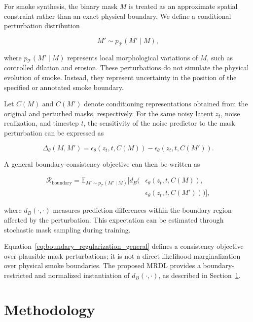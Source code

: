 \documentclass[journal]{IEEEtran}
\begin{document}
For smoke synthesis, the binary mask \(M\) is treated as an approximate
spatial constraint rather than an exact physical boundary. We define a
conditional perturbation distribution

\begin{equation}
M'\sim p_{\mathcal{T}}(M'\mid M),
\label{eq:mask_perturbation_distribution}
\end{equation}

where \(p_{\mathcal{T}}(M'\mid M)\) represents local morphological
variations of \(M\), such as controlled dilation and erosion. These
perturbations do not simulate the physical evolution of smoke. Instead,
they represent uncertainty in the position of the specified or
annotated smoke boundary.

Let \(C(M)\) and \(C(M')\) denote conditioning representations obtained
from the original and perturbed masks, respectively. For the same noisy
latent \(z_t\), noise realization, and timestep \(t\), the sensitivity
of the noise predictor to the mask perturbation can be expressed as

\begin{equation}
\Delta_\theta(M,M')
=
\epsilon_\theta(z_t,t,C(M))
-
\epsilon_\theta(z_t,t,C(M')).
\label{eq:boundary_prediction_difference}
\end{equation}

A general boundary-consistency objective can then be written as

\begin{equation}
\begin{aligned}
\mathcal{R}_{\mathrm{boundary}}
=
\mathbb{E}_{M'\sim p_{\mathcal{T}}(M'\mid M)}
\Big[
d_B\big(
&\epsilon_\theta(z_t,t,C(M)),\\
&\epsilon_\theta(z_t,t,C(M'))
\big)
\Big],
\end{aligned}
\label{eq:boundary_regularization_general}
\end{equation}

where \(d_B(\cdot,\cdot)\) measures prediction differences within the
boundary region affected by the perturbation. This expectation can be
estimated through stochastic mask sampling during training.

Equation~\eqref{eq:boundary_regularization_general} defines a
consistency objective over plausible mask perturbations; it is not a
direct likelihood marginalization over physical smoke boundaries. The
proposed MRDL provides a boundary-restricted and normalized
instantiation of \(d_B(\cdot,\cdot)\), as described in
Section~\ref{sec:method}.
\section{Methodology}
\label{sec:method}
\end{document}
